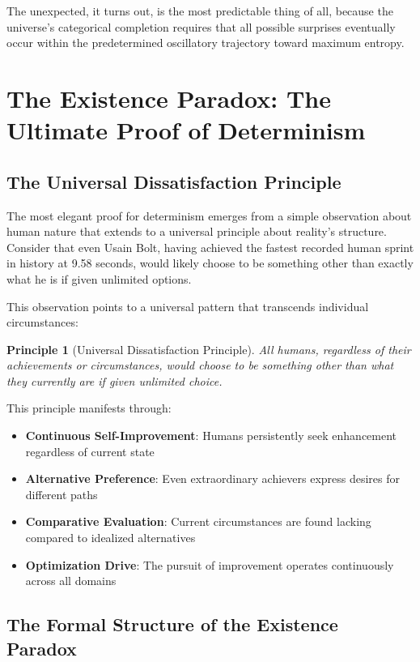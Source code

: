 \documentclass[11pt]{article}
\newtheorem{principle}[theorem]{Principle}
\theoremstyle{remark}
\begin{document}
The unexpected, it turns out, is the most predictable thing of all, because the universe's categorical completion requires that all possible surprises eventually occur within the predetermined oscillatory trajectory toward maximum entropy.

\section{The Existence Paradox: The Ultimate Proof of Determinism}

\subsection{The Universal Dissatisfaction Principle}

The most elegant proof for determinism emerges from a simple observation about human nature that extends to a universal principle about reality's structure. Consider that even Usain Bolt, having achieved the fastest recorded human sprint in history at 9.58 seconds, would likely choose to be something other than exactly what he is if given unlimited options.

This observation points to a universal pattern that transcends individual circumstances:

\begin{principle}[Universal Dissatisfaction Principle]
All humans, regardless of their achievements or circumstances, would choose to be something other than what they currently are if given unlimited choice.
\end{principle}

This principle manifests through:
\begin{itemize}
\item \textbf{Continuous Self-Improvement}: Humans persistently seek enhancement regardless of current state
\item \textbf{Alternative Preference}: Even extraordinary achievers express desires for different paths
\item \textbf{Comparative Evaluation}: Current circumstances are found lacking compared to idealized alternatives
\item \textbf{Optimization Drive}: The pursuit of improvement operates continuously across all domains
\end{itemize}

\subsection{The Formal Structure of the Existence Paradox}
\end{document}
